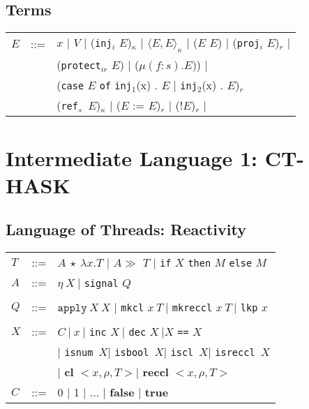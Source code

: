 \documentclass{article}
\begin{document}
\subsection{Terms}

\begin{tabular}[t]{lll}

 $E$ &::=& $x$ $\vert$ $V$ $\vert$ (\texttt{inj}$_i$ $E$)$_\kappa$ $\vert$
           $\langle E , E  \rangle_\kappa$ $\vert$ ($E$ $E$) $\vert$
           (\texttt{proj}$_i$ $E$)$_r$ $\vert$\\
           &&(\texttt{protect}$_{ir}$ $E$) $\vert$
           ($\mu (f : s) . E$)) $\vert$ \\
           &&(\texttt{case} $E$ \texttt{of}
            \texttt{inj}$_1$(x) . $E$ $\vert$ \texttt{inj}$_2$(x) . $E$)$_r$\\
           &&(\texttt{ref$_s$ $E$})$_{\kappa}$ $\vert$ ($E$ := $E$)$_r$ $\vert$
           (!$E$)$_r$ $\vert$\\

\end{tabular}

\section{Intermediate Language 1: CT-HASK}

\subsection{Language of Threads: Reactivity}

\begin{tabular}[t]{lll}
 
$T$ &::=& $A\ \star\ \lambda x . T$ $\vert$
          $A \gg$  $T$
          $\vert$ \texttt{if} $X$ \texttt{then} $M$ \texttt{else} $M$\\

$A$ &::=& $\eta\ X\ \vert $ \texttt{signal} $Q$\\
\\

$Q$ &::=& $\texttt{apply}\ X\ X$ $\vert$ \texttt{mkcl} $x\ T\ \vert$
          \texttt{mkreccl} $x\ T\ \vert$ \texttt{lkp} $x$\\
\\
$X$ &::=& $C\ \vert\ x\ \vert $ \texttt{inc} $X\ \vert $
          \texttt{dec} $X\ \vert X$ \texttt{==} $X$\\
          &&$\vert $ \texttt{isnum}\ $X \vert $ \texttt{isbool}\ $X \vert$
          \texttt{iscl}\ $X \vert $ \texttt{isreccl}\ $X$\\
          &&$\vert$ \textbf{cl} $<x, \rho, T> \vert $
          \textbf{reccl} $<x, \rho, T>$\\

$C$ &::=& 0 $\vert$ 1 $\vert$ ... $\vert$ \textbf{false} $\vert$ \textbf{true} 

\end{tabular}
\end{document}
